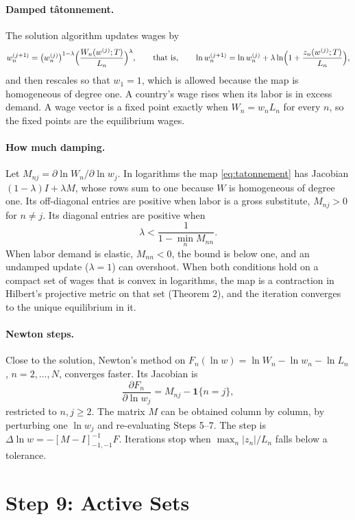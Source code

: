 \documentclass[11pt]{article}
\theoremstyle{remark}
\begin{document}
\paragraph{Damped tâtonnement.} The solution algorithm updates wages by
\begin{equation}
  w_n^{(j+1)}=\bigl(w_n^{(j)}\bigr)^{1-\lambda}\Bigl(\frac{W_n(w^{(j)};T)}{L_n}\Bigr)^{\lambda},
  \qquad\text{that is,}\qquad
  \ln w_n^{(j+1)}=\ln w_n^{(j)}+\lambda\ln\Bigl(1+\frac{z_n(w^{(j)};T)}{L_n}\Bigr),
  \label{eq:tatonnement}
\end{equation}
and then rescales so that $w_1=1$, which is allowed because the map is homogeneous of
degree one. A country's wage rises when its labor is in excess demand. A wage vector
is a fixed point exactly when $W_n=w_nL_n$ for every $n$, so the fixed points are the
equilibrium wages.

\paragraph{How much damping.} Let $M_{nj}=\partial\ln W_n/\partial\ln w_j$. In
logarithms the map \eqref{eq:tatonnement} has Jacobian $(1-\lambda)I+\lambda M$, whose
rows sum to one because $W$ is homogeneous of degree one. Its off-diagonal entries are
positive when labor is a gross substitute, $M_{nj}>0$ for $n\ne j$. Its diagonal
entries are positive when
\[
  \lambda<\frac{1}{1-\min_nM_{nn}} .
\]
When labor demand is elastic, $M_{nn}<0$, the bound is below one, and an undamped
update ($\lambda=1$) can overshoot. When both conditions hold on a compact set of wages
that is convex in logarithms, the map is a contraction in Hilbert's projective metric
on that set (Theorem 2), and the iteration converges to the unique equilibrium in it.

\paragraph{Newton steps.} Close to the solution, Newton's method on
$F_n(\ln w)=\ln W_n-\ln w_n-\ln L_n$, $n=2,\dots,N$, converges faster. Its Jacobian is
\[
  \frac{\partial F_n}{\partial\ln w_j}=M_{nj}-\mathbf 1\{n=j\},
\]
restricted to $n,j\ge2$. The matrix $M$ can be obtained column by column, by perturbing
one $\ln w_j$ and re-evaluating Steps 5--7. The step is
$\Delta\ln w=-[M-I]_{-1,-1}^{-1}F$. Iterations stop when
$\max_n|z_n|/L_n$ falls below a tolerance.

\section{Step 9: Active Sets}
\label{sec:activesets}
\end{document}
